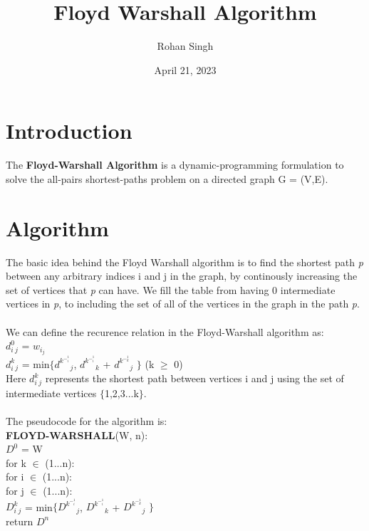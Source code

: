 \documentclass[12pt, letterpaper]{article}
\title{Floyd Warshall Algorithm}
\author{Rohan Singh}
\date{April 21, 2023}
\newcommand\tab[1][1cm]{\hspace*{#1}}
\begin{document}
\maketitle

\section{Introduction}
The \textbf{Floyd-Warshall Algorithm} is a dynamic-programming formulation to solve the all-pairs shortest-paths problem on a directed graph G = (V,E).

\section{Algorithm}
The basic idea behind the Floyd Warshall algorithm is to find the shortest path \textit{p} between any arbitrary indices i and j in the graph, by continously increasing the set of vertices that \textit{p} can have. We fill the table from having 0 intermediate vertices in \textit{p}, to including the set of all of the vertices in the graph in the path \textit{p}.\\\\
We can define the recurence relation in the Floyd-Warshall algorithm as:\\
$d^0_i_j$ = $w_i_j$\\
$d^k_i_j$ = min$\{$$d^k^-^1_i_j$, $d^k^-^1_i_k$ + $d^k^-^1_k_j$  $\}$ (k $\geq$ 0)\\
Here $d^k_i_j$ represents the shortest path between vertices i and j using the set of intermediate vertices $\{$1,2,3...k$\}$.\\\\
The pseudocode for the algorithm is:\\
\textbf{FLOYD-WARSHALL}(W, n):\\
$D^0$ = W\\
for k $\in$ (1...n):\\
\tab for i $\in$ (1...n):\\
\tab \tab for j $\in$ (1...n):\\
\tab \tab \tab $D^k_i_j$ = min$\{$$D^k^-^1_i_j$, $D^k^-^1_i_k$ + $D^k^-^1_k_j$  $\}$\\
return $D^n$
\end{document}
